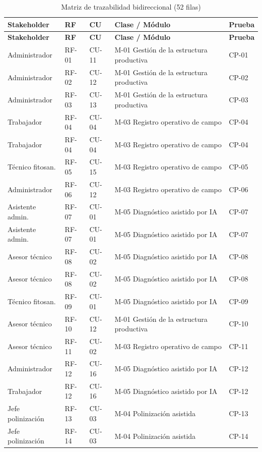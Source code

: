 \documentclass[11pt,letterpaper]{article}
\begin{document}
\begin{longtable}{p{2.6cm} p{1.4cm} p{1.4cm} p{5.4cm} p{1.8cm}}
\caption{Matriz de trazabilidad bidireccional (52 filas)}\\
\toprule
\textbf{Stakeholder} & \textbf{RF} & \textbf{CU} & \textbf{Clase / Módulo} & \textbf{Prueba}\\
\midrule
\endfirsthead
\toprule
\textbf{Stakeholder} & \textbf{RF} & \textbf{CU} & \textbf{Clase / Módulo} & \textbf{Prueba}\\
\midrule
\endhead
\bottomrule
\endfoot
Administrador & RF-01 & CU-11 & M-01 Gestión de la estructura productiva & CP-01\\
Administrador & RF-02 & CU-12 & M-01 Gestión de la estructura productiva & CP-02\\
Administrador & RF-03 & CU-13 & M-01 Gestión de la estructura productiva & CP-03\\
Trabajador & RF-04 & CU-04 & M-03 Registro operativo de campo & CP-04\\
Trabajador & RF-04 & CU-04 & M-03 Registro operativo de campo & CP-04\\
Técnico fitosan. & RF-05 & CU-15 & M-03 Registro operativo de campo & CP-05\\
Administrador & RF-06 & CU-12 & M-03 Registro operativo de campo & CP-06\\
Asistente admin. & RF-07 & CU-01 & M-05 Diagnóstico asistido por IA & CP-07\\
Asistente admin. & RF-07 & CU-01 & M-05 Diagnóstico asistido por IA & CP-07\\
Asesor técnico & RF-08 & CU-02 & M-05 Diagnóstico asistido por IA & CP-08\\
Asesor técnico & RF-08 & CU-02 & M-05 Diagnóstico asistido por IA & CP-08\\
Técnico fitosan. & RF-09 & CU-01 & M-05 Diagnóstico asistido por IA & CP-09\\
Asesor técnico & RF-10 & CU-12 & M-01 Gestión de la estructura productiva & CP-10\\
Asesor técnico & RF-11 & CU-02 & M-03 Registro operativo de campo & CP-11\\
Administrador & RF-12 & CU-16 & M-05 Diagnóstico asistido por IA & CP-12\\
Trabajador & RF-12 & CU-16 & M-05 Diagnóstico asistido por IA & CP-12\\
Jefe polinización & RF-13 & CU-03 & M-04 Polinización asistida & CP-13\\
Jefe polinización & RF-14 & CU-03 & M-04 Polinización asistida & CP-14\\

\end{longtable}
\end{document}
